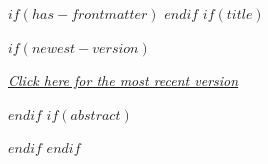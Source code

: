$if(has-frontmatter)$
\frontmatter
$endif$
$if(title)$
\maketitle
$if(newest-version)$
\begin{center}
\href{$newest-version$}{\textit{Click here for the most recent version}}
\end{center}
\vspace{1em}
$endif$
$if(abstract)$
\begin{abstract}
$abstract$
$if(keywords)$

\noindent\rule{0.3\linewidth}{0.4pt}\\[0.4em]
\noindent\textit{\textbf{Keywords:}} $for(keywords)$$it$$sep$, $endfor$
$if(jel-codes)$\\$endif$
$elseif(jel-codes)$

\noindent\rule{0.3\linewidth}{0.4pt}\\[0.4em]
$endif$
$if(jel-codes)$
\noindent\textit{\textbf{JEL Codes:}} $for(jel-codes)$$it$$sep$, $endfor$ \vspace{0.5em}
$endif$
\end{abstract}
$endif$
\clearpage
$endif$
